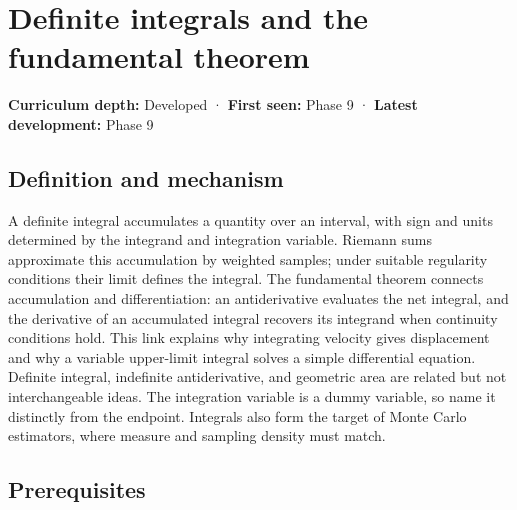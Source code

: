 \hypertarget{appendix-1a50e72435c2}{}\label{referencestart:appendix-1a50e72435c2}
\section{Definite integrals and the fundamental theorem}\label{appendix-1a50e72435c2-definite-integrals-and-the-fundamental-theorem}

\hypertarget{appendix-1a50e72435c2-definite-integrals-and-the-fundamental-theorem}{}

\textbf{Curriculum depth:} Developed · \textbf{First seen:} Phase 9 · \textbf{Latest development:} Phase 9

\begin{allmightroledefinition}

\subsection{Definition and mechanism}\label{appendix-1a50e72435c2-definition-and-mechanism}

\hypertarget{appendix-1a50e72435c2-definition-and-mechanism}{}

A definite integral accumulates a quantity over an interval, with sign and units determined by the integrand and integration variable. Riemann sums approximate this accumulation by weighted samples; under suitable regularity conditions their limit defines the integral. The fundamental theorem connects accumulation and differentiation: an antiderivative evaluates the net integral, and the derivative of an accumulated integral recovers its integrand when continuity conditions hold. This link explains why integrating velocity gives displacement and why a variable upper-limit integral solves a simple differential equation. Definite integral, indefinite antiderivative, and geometric area are related but not interchangeable ideas. The integration variable is a dummy variable, so name it distinctly from the endpoint. Integrals also form the target of Monte Carlo estimators, where measure and sampling density must match.

\end{allmightroledefinition}

\subsection{Prerequisites}\label{appendix-1a50e72435c2-prerequisites}

\hypertarget{appendix-1a50e72435c2-prerequisites}{}

